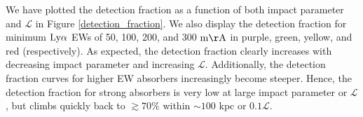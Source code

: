 %

We have plotted the detection fraction as a function of both impact parameter and $\mathcal{L}$ in Figure \ref{detection_fraction}. We also display the detection fraction for minimum $\rm Ly\alpha$ EWs of 50, 100, 200, and 300 $\rm m\AA$ in purple, green, yellow, and red (respectively). As expected, the detection fraction clearly increases with decreasing impact parameter and increasing $\mathcal{L}$. Additionally, the detection fraction curves for higher EW absorbers increasingly become steeper. Hence, the detection fraction for strong absorbers is very low at large impact parameter or $\mathcal{L}$, but climbs quickly back to $\gtrsim 70\%$ within $\sim 100$ kpc or $0.1 \mathcal{L}$. 

